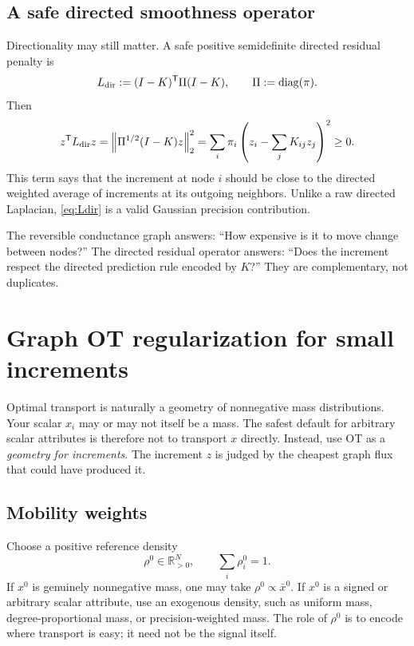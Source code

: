 \documentclass[11pt]{article}
\numberwithin{equation}{section}
\newcommand{\R}{\mathbb{R}}
\newcommand{\diag}{\operatorname{diag}}
\newcommand{\transpose}{^{\mathsf T}}
\newcommand{\norm}[1]{\left\lVert #1\right\rVert}
\begin{document}
\subsection{A safe directed smoothness operator}

Directionality may still matter.  A safe positive semidefinite directed residual penalty is
\begin{equation}
  L_{\rm dir}:=(I-K)\transpose\Pi(I-K),
  \qquad
  \Pi:=\diag(\pi).
  \label{eq:Ldir}
\end{equation}
Then
\begin{equation}
  z\transpose L_{\rm dir}z
  =\norm{\Pi^{1/2}(I-K)z}_2^2
  =\sum_i\pi_i\left(z_i-\sum_jK_{ij}z_j\right)^2\ge0.
  \label{eq:Ldir-psd}
\end{equation}
This term says that the increment at node $i$ should be close to the directed weighted average of increments at its outgoing neighbors.  Unlike a raw directed Laplacian, \eqref{eq:Ldir} is a valid Gaussian precision contribution.

\begin{heuristicbox}
The reversible conductance graph answers: ``How expensive is it to move change between nodes?''  The directed residual operator answers: ``Does the increment respect the directed prediction rule encoded by $K$?''  They are complementary, not duplicates.
\end{heuristicbox}

\section{Graph OT regularization for small increments}
\label{sec:ot-regularization}

Optimal transport is naturally a geometry of nonnegative mass distributions.  Your scalar $x_i$ may or may not itself be a mass.  The safest default for arbitrary scalar attributes is therefore not to transport $x$ directly.  Instead, use OT as a \emph{geometry for increments}.  The increment $z$ is judged by the cheapest graph flux that could have produced it.

\subsection{Mobility weights}

Choose a positive reference density
\begin{equation}
  \rho^0\in\R^N_{>0},
  \qquad
  \sum_i\rho_i^0=1.
  \label{eq:reference-density}
\end{equation}
If $x^0$ is genuinely nonnegative mass, one may take $\rho^0\propto \bar x^0$.  If $x^0$ is a signed or arbitrary scalar attribute, use an exogenous density, such as uniform mass, degree-proportional mass, or precision-weighted mass.  The role of $\rho^0$ is to encode where transport is easy; it need not be the signal itself.
\end{document}

